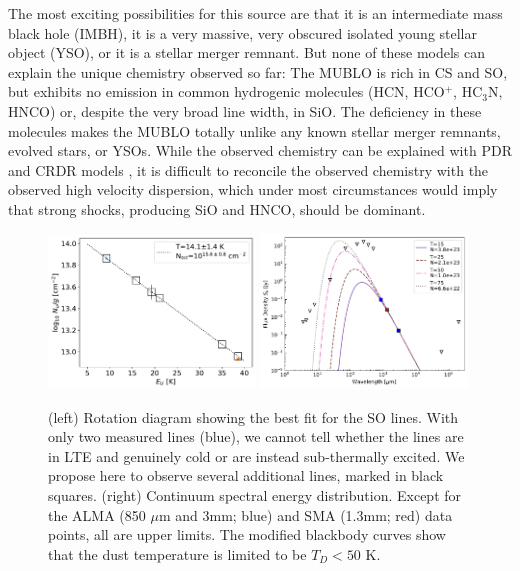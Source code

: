 \documentclass[12pt,a4paper]{article}  %
\begin{document}
The most exciting possibilities for this source are that it is an intermediate mass black hole (IMBH), it is a very massive, very obscured isolated young stellar object (YSO), or it is a stellar merger remnant.
But none of these models can explain the unique chemistry observed so far:
The MUBLO is rich in CS and SO, but exhibits no emission in common hydrogenic molecules (HCN, HCO$^+$, HC$_3$N, HNCO) or, despite the very broad line width, in SiO.
The deficiency in these molecules makes the MUBLO totally unlike any known stellar merger remnants, evolved stars, or YSOs.
While the observed chemistry can be explained with PDR and CRDR models \citep{Ginsburg2024}, it is difficult to reconcile the observed chemistry with the observed high velocity dispersion, which under most circumstances would imply that strong shocks, producing SiO and HNCO, should be dominant.




\begin{figure}
    \centering
    \includegraphics[width=0.49\textwidth]{figures/LTE_rotationdiagram_fit_plannedobs.pdf}
    \includegraphics[width=0.49\textwidth]{figures/SED_with_upperlimits_VLA_SMA.pdf}
    \caption{(left) Rotation diagram showing the best fit for the SO lines.
    With only two measured lines (blue), we cannot tell whether the lines are in LTE and genuinely cold or are instead sub-thermally excited.
    We propose here to observe several additional lines, marked in black squares.
    (right) Continuum spectral energy distribution. Except for the ALMA (850 $\mu$m and 3mm; blue) and SMA (1.3mm; red) data points, all are upper limits.  The modified blackbody curves show that the dust temperature is limited to be $T_D<50$ K.
    }
    \label{fig:LTErotationdiagram}
\end{figure}
\end{document}
